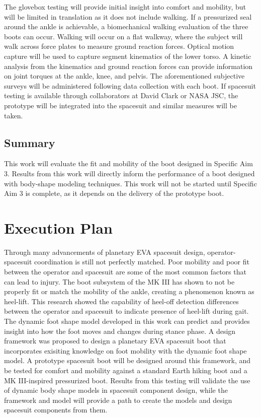 \documentclass[defaultstyle,11pt]{comps}
\begin{document}
The glovebox testing will provide initial insight into comfort and mobility, but will be limited in translation as it does not include walking.
If a pressurized seal around the ankle is achievable, a biomechanical walking evaluation of the three boots can occur.
Walking will occur on a flat walkway, where the subject will walk across force plates to measure ground reaction forces.
Optical motion capture will be used to capture segment kinematics of the lower torso.
A kinetic analysis from the kinematics and ground reaction forces can provide information on joint torques at the ankle, knee, and pelvis.
The aforementioned subjective surveys will be administered following data collection with each boot.
If spacesuit testing is available through collaborators at David Clark or NASA JSC, the prototype will be integrated into the spacesuit and similar measures will be taken.

\hypertarget{summary-5}{%
\section{Summary}\label{summary-5}}

This work will evaluate the fit and mobility of the boot designed in Specific Aim 3.
Results from this work will directly inform the performance of a boot designed with body-shape modeling techniques.
This work will not be started until Specific Aim 3 is complete, as it depends on the delivery of the prototype boot.

\hypertarget{execution-plan}{%
\chapter{Execution Plan}\label{execution-plan}}

Through many advancements of planetary EVA spacesuit design, operator-spacesuit coordination is still not perfectly matched.
Poor mobility and poor fit between the operator and spacesuit are some of the most common factors that can lead to injury.
The boot subsystem of the MK III has shown to not be properly fit or match the mobility of the ankle, creating a phenomenon known as heel-lift.
This research showed the capability of heel-off detection differences between the operator and spacesuit to indicate presence of heel-lift during gait.
The dynamic foot shape model developed in this work can predict and provides insight into how the foot moves and changes during stance phase.
A design framework was proposed to design a planetary EVA spacesuit boot that incorporates exisiting knowledge on foot mobility with the dynamic foot shape model.
A prototype spacesuit boot will be designed around this framework, and be tested for comfort and mobility against a standard Earth hiking boot and a MK III-inspired pressurized boot.
Results from this testing will validate the use of dynamic body shape models in spacesuit component design, while the framework and model will provide a path to create the models and design spacesuit components from them.
\end{document}
